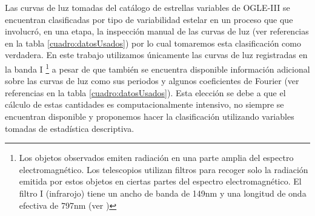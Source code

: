 \documentclass[letterpaper,12pt]{book}
\begin{document}
Las curvas de luz tomadas del catálogo de estrellas variables de OGLE-III se encuentran clasificadas por tipo de variabilidad estelar en un proceso que que involucró, en una etapa, la inspección manual de las curvas de luz (ver referencias en la tabla \ref{cuadro:datosUsados}) por lo cual tomaremos esta clasificación como verdadera. En este trabajo utilizamos únicamente las curvas de luz registradas en la banda I \footnote{Los objetos observados emiten radiación en una parte amplia del espectro electromagnético. Los telescopios utilizan filtros para recoger solo la radiación emitida por estos objetos en ciertas partes del espectro electromagnético. El filtro I (infrarojo) tiene un ancho de banda de 149nm y una longitud de onda efectiva de 797nm (ver \cite{karttunen_fundamental_2007})} a pesar de que también se encuentra disponible información adicional sobre las curvas de luz como sus periodos y algunos coeficientes de Fourier (ver referencias en la tabla \ref{cuadro:datosUsados}). Esta elección se debe a que el cálculo de estas cantidades es computacionalmente intensivo, no siempre se encuentran disponible y proponemos hacer la clasificación utilizando variables tomadas de estadística descriptiva.
\end{document}
